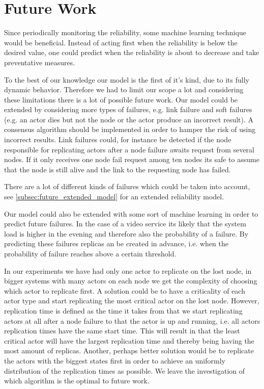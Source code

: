 \documentclass{cslthse-msc}
\begin{document}
\chapter{Future Work} \label{ch:future_work}
Since periodically monitoring the reliability, some machine learning technique would be beneficial. Instead of acting first when the reliability is below the desired value, one could predict when the reliability is about to decrease and take preventative measures.

To the best of our knowledge our model is the first of it's kind, due to its fully dynamic behavior. Therefore we had to limit our scope a lot and considering these limitations there is a lot of possible future work. Our model could be extended by considering more types of failures, e.g. link failure and soft failures (e.g. an actor dies but not the node or the actor produce an incorrect result). A consensus algorithm should be implemented in order to hamper the risk of using incorrect results. Link failures could, for instance be detected if the node responsible for replicating actors after a node failure awaits request from several nodes. If it only receives one node fail request among ten nodes its safe to assume that the node is still alive and the link to the requesting node has failed.

There are a lot of different kinds of failures which could be taken into account, see \cref{subsec:future_extended_model} for an extended reliability model.

Our model could also be extended with some sort of machine learning in order to predict future failures. In the case of a video service its likely that the system load is higher in the evening and therefore also the probability of a failure. By predicting these failures replicas an be created in advance, i.e. when the probability of failure reaches above a certain threshold.

In our experiments we have had only one actor to replicate on the lost node, in bigger systems with many actors on each node we get the complexity of choosing which actor to replicate first. A solution could be to have a criticality of each actor type and start replicating the most critical actor on the lost node. However, replication time is defined as the time it takes from that we start replicating actors at all after a node failure to that the actor is up and running, i.e. all actors replication times have the same start time. This will result in that the least critical actor will have the largest replication time and thereby being having the most amount of replicas. 
Another, perhaps better solution would be to replicate the actors with the biggest states first in order to achieve an uniformly distribution of the replication times as possible. We leave the investigation of which algorithm is the optimal to future work.
\end{document}
